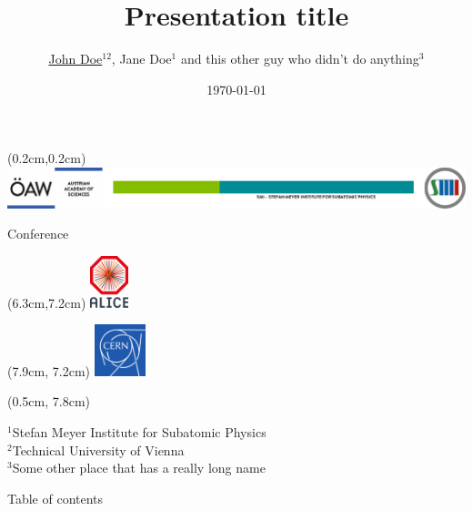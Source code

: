 \documentclass[9pt, aspectratio=169]{beamer}
\author{\underline{John Doe$^{12}$}, Jane Doe$^1$ and this other guy who didn't do anything$^3$}
\title{Presentation title}
\date{\scriptsize \today}
\newcommand{\conference}{\scriptsize Conference}
\begin{document}
\begin{frame}[plain]
    \begin{textblock*}{\textwidth}(0.2cm,0.2cm)
        \includegraphics[width=1.11\textwidth]{smi-template/oeaw-smi-logos.pdf}
    \end{textblock*}
    \vspace{0.8cm}
    \begin{center}
        {\large \bfseries \color{OEAWblue} \inserttitle\par}
        \vspace{1cm}
        
        {\insertauthor\par}
        \vspace{1cm}
        
        {\insertdate\par}
        \conference
        \begin{textblock*}{\textwidth}(6.3cm,7.2cm)
            \includegraphics[height=1.5cm]{smi-template/more-logos/alice-logo.png}
        \end{textblock*}
        \begin{textblock*}{\textwidth}(7.9cm, 7.2cm)
            \includegraphics[height=1.5cm]{smi-template/more-logos/cern-logo.png}
        \end{textblock*}
    \begin{textblock*}{\textwidth}(0.5cm, 7.8cm)
        \raggedright
        $^1$Stefan Meyer Institute for Subatomic Physics\\
        $^2$Technical University of Vienna\\
        $^3$Some other place that has a really long name
    \end{textblock*}
    \end{center}
\end{frame}
\begin{frame}{Table of contents}
\tableofcontents[sectionstyle=show,
subsectionstyle=show/shaded/hide,
subsubsectionstyle=show/shaded/hide]
\end{frame}
\end{document}
